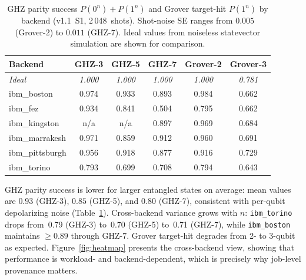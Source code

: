 \documentclass[aps,prxquantum,twocolumn,superscriptaddress,amsmath,amssymb,longbibliography,floatfix]{revtex4-2}
\begin{document}
\begin{table}[t]
\caption{GHZ parity success $P(0^n){+}P(1^n)$ and Grover target-hit $P(1^n)$ by backend (v1.1~S1, 2\,048~shots). Shot-noise SE ranges from $0.005$ (Grover-2) to $0.011$ (GHZ-7). Ideal values from noiseless statevector simulation are shown for comparison.}
\label{tab:ghz_grover}
\begin{ruledtabular}
\begin{tabular}{lccccc}
Backend & GHZ-3 & GHZ-5 & GHZ-7 & Grover-2 & Grover-3 \\
\hline
\textit{Ideal}  & \textit{1.000} & \textit{1.000} & \textit{1.000} & \textit{1.000} & \textit{0.781} \\
\hline
ibm\_boston     & 0.974 & 0.933 & 0.893 & 0.984 & 0.662 \\
ibm\_fez       & 0.934 & 0.841 & 0.504 & 0.795 & 0.662 \\
ibm\_kingston  & n/a   & n/a   & 0.897 & 0.969 & 0.684 \\
ibm\_marrakesh & 0.971 & 0.859 & 0.912 & 0.960 & 0.691 \\
ibm\_pittsburgh& 0.956 & 0.918 & 0.877 & 0.916 & 0.729 \\
ibm\_torino    & 0.793 & 0.699 & 0.708 & 0.794 & 0.643 \\
\end{tabular}
\end{ruledtabular}
\end{table}

GHZ parity success is lower for larger entangled states on average: mean values are $0.93$ (GHZ-3), $0.85$ (GHZ-5), and $0.80$ (GHZ-7), consistent with per-qubit depolarizing noise (Table~\ref{tab:ghz_grover}). Cross-backend variance grows with $n$: \texttt{ibm\_torino} drops from~0.79 (GHZ-3) to~0.70 (GHZ-5) to~0.71 (GHZ-7), while \texttt{ibm\_boston} maintains $\geq 0.89$ through GHZ-7. Grover target-hit degrades from 2- to 3-qubit as expected. Figure~\ref{fig:heatmap} presents the cross-backend view, showing that performance is workload- and backend-dependent, which is precisely why job-level provenance matters.
\end{document}
